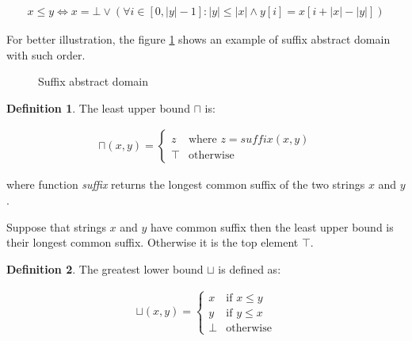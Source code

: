 \documentclass[12pt,final,oneside]{fithesis2}
\theoremstyle{definition}
\newtheorem{definition}{Definition}
\begin{document}
\begin{align*}
x \leq y \Leftrightarrow
  x = \bot \lor (\forall i \in [0, |y| - 1] : |y| \leq |x| \land
    y[i] = x[i + |x| - |y|])
\end{align*}

For better illustration, the figure \ref{fig:suffixlattice} shows an
example of suffix abstract domain with such order.

\begin{figure}[h]
\centering
{}
\caption{Suffix abstract domain}
\label{fig:suffixlattice}
\end{figure}

\begin{definition}
\label{def:suffixjoin}
The least upper bound $\sqcap$ is:

\begin{align*}
\sqcap (x, y) =
\begin{cases}
z    & \text{where } z = \textit{suffix}(x,  y) \\
\top & \text{otherwise}
\end{cases}
\end{align*}

where function \textit{suffix} returns the longest common suffix of the
two strings $x$ and $y$.
\end{definition}

Suppose that strings $x$ and $y$ have common suffix then the least
upper bound is their longest common suffix. Otherwise it is the top
element $\top$.

\begin{definition}
\label{def:suffixmeet}
The greatest lower bound $\sqcup$ is defined as:

\begin{align*}
\sqcup (x, y) =
\begin{cases}
x    & \text{if } x \leq y \\
y    & \text{if } y \leq x \\
\bot & \text{otherwise}
\end{cases}
\end{align*}
\end{definition}
\end{document}
